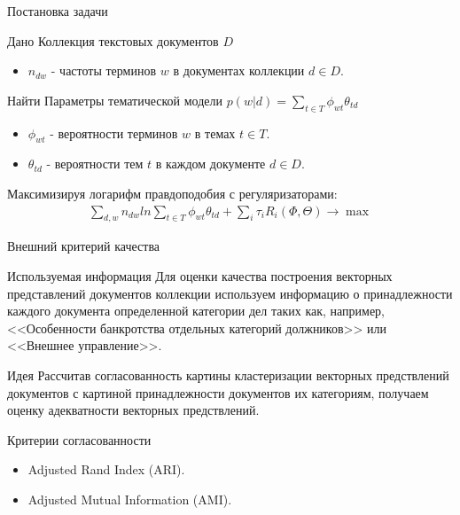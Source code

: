 \documentclass{beamer}
\begin{document}
\begin{frame}{Постановка задачи}
\begin{block}{Дано}
	Коллекция текстовых документов $D$
    \begin{itemize}
        \item $n_{dw}$ - частоты терминов $w$ в документах коллекции $d \in D$.
    \end{itemize} 
    \end{block}
\begin{block}{Найти}
	Параметры тематической модели $p(w|d)=\sum\limits_{t \in T} {\phi_{wt}\theta_{td}}$
    \begin{itemize}
        \item $\phi_{wt}$ - вероятности терминов $w$ в темах $t \in T$.
        \item $\theta_{td}$ - вероятности тем $t$ в каждом документе $d \in D$.
    \end{itemize} 
	Максимизируя логарифм правдоподобия с регуляризаторами:
\begin{align*}
	\sum\limits_{d,w} {n_{dw}ln\sum\limits_{t \in T}} {\phi_{wt}\theta_{td}}+\sum\limits_{i}\tau_{i}R_{i}(\Phi,\Theta)\to \max
\end{align*} 
    \end{block}
\end{frame}
\begin{frame}{Внешний критерий качества}
\begin{block}{Используемая информация}
	Для оценки качества построения векторных представлений документов коллекции используем информацию о принадлежности каждого документа определенной категории дел таких как, например, <<Особенности банкротства отдельных категорий должников>> или <<Внешнее управление>>.
    \end{block}
\begin{block}{Идея}
	Рассчитав согласованность картины кластеризации векторных предствлений документов с картиной принадлежности документов их категориям, получаем оценку адекватности векторных предствлений. 
    \end{block}
\begin{block}{Критерии согласованности}
    \begin{itemize}
        \item Adjusted Rand Index (ARI).
        \item Adjusted Mutual Information (AMI).
    \end{itemize} 
    \end{block}
 
\end{frame}
\end{document}
